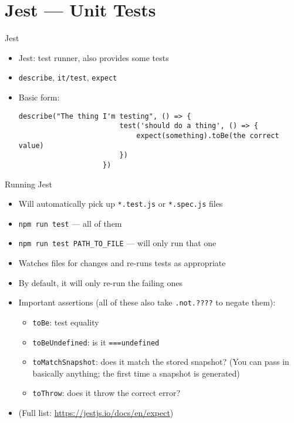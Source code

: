 \documentclass[t]{beamer}
\begin{document}
	\section{Jest --- Unit Tests}
	\begin{frame}[fragile]{Jest}
		\begin{itemize}
			\item Jest: test runner, also provides some tests
			\item \texttt{describe}, \texttt{it/test}, \texttt{expect}
			\item Basic form:
				\begin{lstlisting}[autogobble]
					describe("The thing I'm testing", () => {
						test('should do a thing', () => {
							expect(something).toBe(the correct value)
						})
					})
				\end{lstlisting}
		\end{itemize}
	\end{frame}

	\begin{frame}[fragile]{Running Jest}
		\begin{itemize}
			\item Will automatically pick up \texttt{*.test.js} or \texttt{*.spec.js} files
			\item \texttt{npm run test} --- all of them
			\item \texttt{npm run test PATH\_TO\_FILE} --- will only run that one
			\item Watches files for changes and re-runs tests as appropriate
			\item By default, it will only re-run the failing ones
			\item Important assertions (all of these also take \texttt{.not.????} to negate them):
				\begin{itemize}
					\item \texttt{toBe}: test equality
					\item \texttt{toBeUndefined}: is it \texttt{===undefined}
					\item \texttt{toMatchSnapshot}: does it match the stored snapshot? (You can pass in basically anything; the first time a snapshot is generated)
					\item \texttt{toThrow}: does it throw the correct error?
				\end{itemize}
			\item (Full list: \url{https://jestjs.io/docs/en/expect})
		\end{itemize}
	\end{frame}
\end{document}
